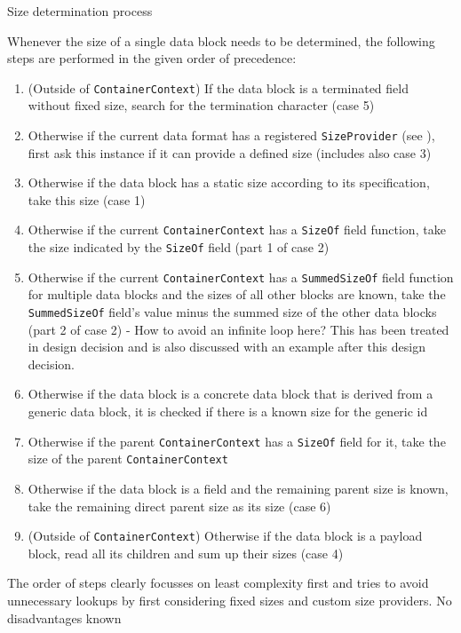 {%
Size determination process
}
{%
  Whenever the size of a single data block needs to be determined, the following steps are performed in the given order of precedence:
\begin{enumerate}
\item (Outside of \texttt{ContainerContext}) If the data block is a terminated field without fixed size, search for the termination character (case 5)
\item Otherwise if the current data format has a registered \texttt{SizeProvider} (see ), first ask this instance if it can provide a defined size (includes also case 3)
\item Otherwise if the data block has a static size according to its specification, take this size (case 1)
\item Otherwise if the current \texttt{ContainerContext} has a \texttt{SizeOf} field function, take the size indicated by the \texttt{SizeOf} field (part 1 of case 2)
\item Otherwise if the current \texttt{ContainerContext} has a \texttt{SummedSizeOf} field function for multiple data blocks and the sizes of all other blocks are known, take the \texttt{SummedSizeOf} field's value minus the summed size of the other data blocks (part 2 of case 2) - How to avoid an infinite loop here? This has been treated in design decision  and is also discussed with an example after this design decision.
\item Otherwise if the data block is a concrete data block that is derived from a generic data block, it is checked if there is a known size for the generic id  
\item Otherwise if the parent \texttt{ContainerContext} has a \texttt{SizeOf} field for it, take the size of the parent \texttt{ContainerContext}
\item Otherwise if the data block is a field and the remaining parent size is known, take the remaining direct parent size as its size (case 6)
\item (Outside of \texttt{ContainerContext}) Otherwise if the data block is a payload block, read all its children and sum up their sizes (case 4)
\end{enumerate}
}
{%
The order of steps clearly focusses on least complexity first and tries to avoid unnecessary lookups by first considering fixed sizes and custom size providers.
}
{%
No disadvantages known
}


